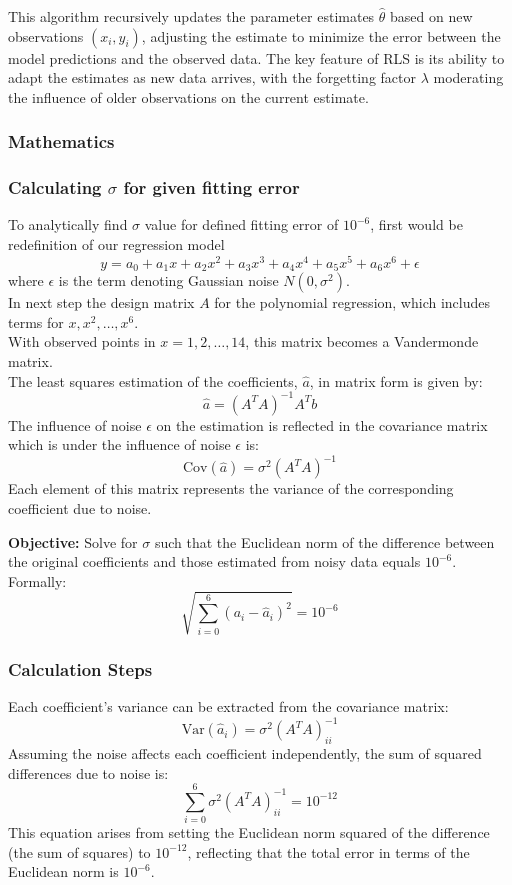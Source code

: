 This algorithm recursively updates the parameter estimates \( \hat{\theta} \) based on new observations \( (x_i, y_i) \), adjusting the estimate to minimize the error between the model predictions and the observed data. The key feature of RLS is its ability to adapt the estimates as new data arrives, with the forgetting factor \( \lambda \) moderating the influence of older observations on the current estimate.

\subsubsection*{Mathematics}
\subsubsection*{Calculating $\sigma$ for given fitting error}
To analytically find $\sigma$ value for defined fitting error of $10^{-6}$, first would be redefinition of our regression model
\[
    y = a_0 + a_1 x + a_2 x^2 + a_3 x^3 + a_4 x^4 + a_5 x^5 + a_6 x^6 + \epsilon
\]
where \(\epsilon\) is the term denoting Gaussian noise \(N(0, \sigma^2)\).\\
In next step the design matrix \(A\) for the polynomial regression, which includes terms for \(x, x^2, \ldots, x^6\).\\
With observed points in \(x = 1, 2, \ldots, 14\), this matrix becomes a Vandermonde matrix.\\
The least squares estimation of the coefficients, \(\hat{a}\), in matrix form is given by:
\[
    \hat{a} = (A^T A)^{-1} A^T b
\]
The influence of noise \(\epsilon\) on the estimation is reflected in the covariance matrix which is under the influence of noise \(\epsilon\) is:
\[
    \text{Cov}(\hat{a}) = \sigma^2 (A^T A)^{-1}
\]
Each element of this matrix represents the variance of the corresponding coefficient due to noise.

\textbf{Objective:}
Solve for \(\sigma\) such that the Euclidean norm of the difference between the original coefficients and those estimated from noisy data equals \(10^{-6}\). Formally:
\[
    \sqrt{\sum_{i=0}^6 (a_i - \hat{a}_i)^2} = 10^{-6}
\]

\subsubsection*{Calculation Steps}
Each coefficient's variance can be extracted from the covariance matrix:
\[
    \text{Var}(\hat{a}_i) = \sigma^2 (A^T A)^{-1}_{ii}
\]
Assuming the noise affects each coefficient independently, the sum of squared differences due to noise is:
\[
    \sum_{i=0}^6 \sigma^2 (A^T A)^{-1}_{ii} = 10^{-12}
\]
This equation arises from setting the Euclidean norm squared of the difference (the sum of squares) to \(10^{-12}\), reflecting that the total error in terms of the Euclidean norm is \(10^{-6}\).

